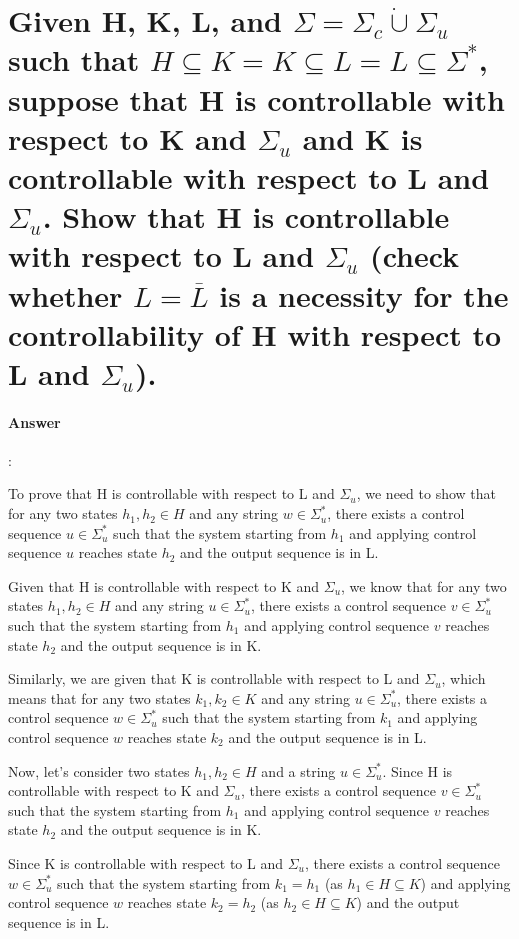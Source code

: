 \documentclass{article}
\begin{document}
\section{Given H, K, L, and $\Sigma = \Sigma_c \dot{\cup} \Sigma_u$ such that $H \subseteq K = K \subseteq L = L \subseteq \Sigma^*$, suppose that H is controllable with respect to K and $\Sigma_u$ and K is controllable with respect to L and $\Sigma_u$. Show that H is controllable with respect to L and $\Sigma_u$ (check whether $L = \overline{L}$ is a necessity for the controllability of H with respect to L and $\Sigma_u$).}

\paragraph{Answer}:

To prove that H is controllable with respect to L and $\Sigma_u$, we need to show that for any two states $h_1, h_2 \in H$ and any string $w \in \Sigma_u^*$, there exists a control sequence $u \in \Sigma_u^*$ such that the system starting from $h_1$ and applying control sequence $u$ reaches state $h_2$ and the output sequence is in L.

Given that H is controllable with respect to K and $\Sigma_u$, we know that for any two states $h_1, h_2 \in H$ and any string $u \in \Sigma_u^*$, there exists a control sequence $v \in \Sigma_u^*$ such that the system starting from $h_1$ and applying control sequence $v$ reaches state $h_2$ and the output sequence is in K.

Similarly, we are given that K is controllable with respect to L and $\Sigma_u$, which means that for any two states $k_1, k_2 \in K$ and any string $u \in \Sigma_u^*$, there exists a control sequence $w \in \Sigma_u^*$ such that the system starting from $k_1$ and applying control sequence $w$ reaches state $k_2$ and the output sequence is in L.

Now, let's consider two states $h_1, h_2 \in H$ and a string $u \in \Sigma_u^*$. Since H is controllable with respect to K and $\Sigma_u$, there exists a control sequence $v \in \Sigma_u^*$ such that the system starting from $h_1$ and applying control sequence $v$ reaches state $h_2$ and the output sequence is in K.

Since K is controllable with respect to L and $\Sigma_u$, there exists a control sequence $w \in \Sigma_u^*$ such that the system starting from $k_1 = h_1$ (as $h_1 \in H \subseteq K$) and applying control sequence $w$ reaches state $k_2 = h_2$ (as $h_2 \in H \subseteq K$) and the output sequence is in L.
\end{document}
